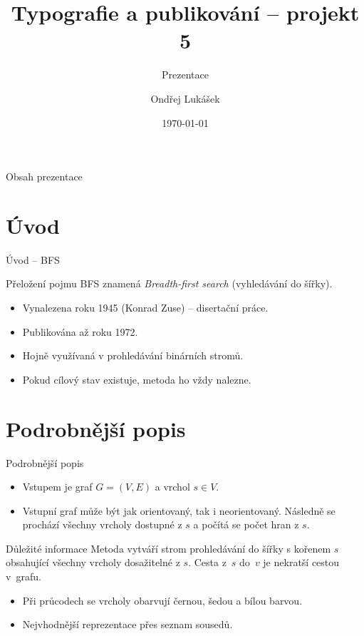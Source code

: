 \documentclass[10pt, czech]{beamer}
\title{Typografie a publikování -- projekt 5}
\subtitle{Prezentace}
\author{Ondřej Lukášek}
\institute[Vysoké učení technické v Brně]
{
  Vysoké učení technické v Brně, \\
  Fakulta informačních technologií
}
\date{\today}
\begin{document}
\begin{frame}
    \titlepage
\end{frame}

\begin{frame}{Obsah prezentace}
    \tableofcontents
\end{frame}

\section{Úvod}
\begin{frame}{Úvod -- BFS}
    \begin{block}{Přeložení pojmu}
        BFS znamená \textit{Breadth-first search} (vyhledávání do šířky).
    \end{block}
    \begin{itemize}
        \item Vynalezena roku 1945 (Konrad Zuse) -- disertační práce.
        \item Publikována až roku 1972.
        \item Hojně využívaná v prohledávání binárních stromů.
        \item Pokud cílový stav existuje, metoda ho vždy nalezne.
    \end{itemize}
\end{frame}

\section{Podrobnější popis}
\begin{frame}{Podrobnější popis}
    \begin{itemize}
        \item Vstupem je graf $G = (V, E)$ a vrchol $s \in V$.
        \item Vstupní graf může být jak orientovaný, tak i neorientovaný.
        Následně se prochází všechny vrcholy dostupné z $s$ a počítá se počet hran z $s$.
    \end{itemize}
    \begin{alertblock}{Důležité informace}
        Metoda vytváří strom prohledávání do šířky s kořenem $s$ obsahující všechny vrcholy dosažitelné z $s$. Cesta z~$s$ do~$v$ je nekratší cestou v~grafu.
    \end{alertblock}
    \begin{itemize}
        \item Při průcodech se vrcholy obarvují černou, šedou a bílou barvou.
        \item Nejvhodnější reprezentace přes seznam sousedů.
    \end{itemize}
\end{frame}
\end{document}
